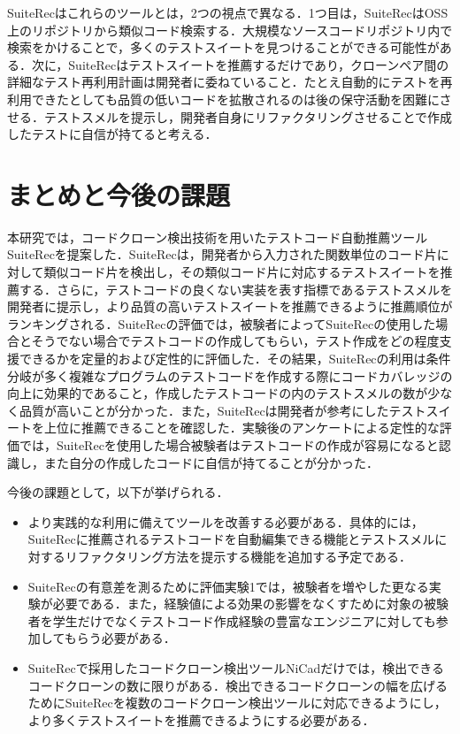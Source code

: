\documentclass[12pt]{jarticle} %
\begin{document}
{\sf SuiteRec}はこれらのツールとは，2つの視点で異なる．1つ目は，{\sf SuiteRec}はOSS上のリポジトリから類似コード検索する．大規模なソースコードリポジトリ内で検索をかけることで，多くのテストスイートを見つけることができる可能性がある．次に，{\sf SuiteRec}はテストスイートを推薦するだけであり，クローンペア間の詳細なテスト再利用計画は開発者に委ねていること．たとえ自動的にテストを再利用できたとしても品質の低いコードを拡散されるのは後の保守活動を困難にさせる．テストスメルを提示し，開発者自身にリファクタリングさせることで作成したテストに自信が持てると考える．

\newpage
\section{まとめと今後の課題}
本研究では，コードクローン検出技術を用いたテストコード自動推薦ツール{\sf SuiteRec}を提案した．{\sf SuiteRec}は，開発者から入力された関数単位のコード片に対して類似コード片を検出し，その類似コード片に対応するテストスイートを推薦する．さらに，テストコードの良くない実装を表す指標であるテストスメルを開発者に提示し，より品質の高いテストスイートを推薦できるように推薦順位がランキングされる．{\sf SuiteRec}の評価では，被験者によって{\sf SuiteRec}の使用した場合とそうでない場合でテストコードの作成してもらい，テスト作成をどの程度支援できるかを定量的および定性的に評価した．その結果，{\sf SuiteRec}の利用は条件分岐が多く複雑なプログラムのテストコードを作成する際にコードカバレッジの向上に効果的であること，作成したテストコードの内のテストスメルの数が少なく品質が高いことが分かった．また，{\sf SuiteRec}は開発者が参考にしたテストスイートを上位に推薦できることを確認した．実験後のアンケートによる定性的な評価では，{\sf SuiteRec}を使用した場合被験者はテストコードの作成が容易になると認識し，また自分の作成したコードに自信が持てることが分かった．

今後の課題として，以下が挙げられる．

\begin{itemize}
\item より実践的な利用に備えてツールを改善する必要がある．具体的には，{\sf SuiteRec}に推薦されるテストコードを自動編集できる機能とテストスメルに対するリファクタリング方法を提示する機能を追加する予定である．
\item {\sf SuiteRec}の有意差を測るために評価実験1では，被験者を増やした更なる実験が必要である．また，経験値による効果の影響をなくすために対象の被験者を学生だけでなくテストコード作成経験の豊富なエンジニアに対しても参加してもらう必要がある．
\item {\sf SuiteRec}で採用したコードクローン検出ツール{\sf NiCad}だけでは，検出できるコードクローンの数に限りがある．検出できるコードクローンの幅を広げるために{\sf SuiteRec}を複数のコードクローン検出ツールに対応できるようにし，より多くテストスイートを推薦できるようにする必要がある．
\end{itemize}
\end{document}
